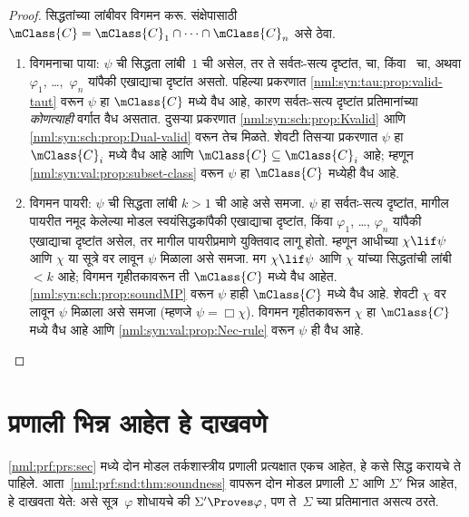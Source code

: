 \begin{proof}
  सिद्धतांच्या लांबीवर विगमन करू. संक्षेपासाठी
  $\mClass{C} =
  \mClass{C}_1 \cap \dots \cap \mClass{C}_n$ असे ठेवा.
  \begin{enumerate}
  \item विगमनाचा पाया: $\psi$ ची सिद्धता लांबी~$1$
    ची असेल, तर ते सर्वतः-सत्य दृष्टांत,
     चा, किंवा~\Dual{} चा,
    अथवा $\varphi_1$, \dots,~$\varphi_n$ यांपैकी
    एखाद्याचा दृष्टांत असतो. पहिल्या प्रकरणात
    \ref{nml:syn:tau:prop:valid-taut} वरून $\psi$
    हा $\mClass{C}$ मध्ये वैध आहे, कारण सर्वतः-सत्य
    दृष्टांत प्रतिमानांच्या \emph{कोणत्याही} वर्गात
    वैध असतात. दुसऱ्या प्रकरणात
    \ref{nml:syn:sch:prop:Kvalid} आणि
      \ref{nml:syn:sch:prop:Dual-valid} वरून तेच
    मिळते. शेवटी तिसऱ्या प्रकरणात $\psi$ हा
    $\mClass{C}_i$ मध्ये वैध आहे आणि
    $\mClass{C} \subseteq \mClass{C}_i$ आहे;
    म्हणून \ref{nml:syn:val:prop:subset-class}
    वरून $\psi$ हा $\mClass{C}$ मध्येही वैध आहे.
  \item विगमन पायरी: $\psi$ ची सिद्धता लांबी $k>1$
    ची आहे असे समजा. $\psi$ हा सर्वतः-सत्य दृष्टांत,
    मागील पायरीत नमूद केलेल्या मोडल स्वयंसिद्धकांपैकी
    एखाद्याचा दृष्टांत, किंवा $\varphi_1$, \dots,
    $\varphi_n$ यांपैकी एखाद्याचा दृष्टांत असेल,
    तर मागील पायरीप्रमाणे युक्तिवाद लागू होतो.
    म्हणून आधीच्या
    $\chi \lif \psi$ आणि $\chi$ या सूत्रे वर
    \MP{} लावून $\psi$ मिळाला असे समजा. मग
    $\chi \lif \psi$ आणि $\chi$ यांच्या सिद्धतांची
    लांबी $<k$ आहे; विगमन गृहीतकावरून ती
    $\mClass{C}$ मध्ये वैध आहेत.
    \ref{nml:syn:sch:prop:soundMP} वरून $\psi$
    हाही $\mClass{C}$ मध्ये वैध आहे. शेवटी
    $\chi$ वर \Nec{} लावून $\psi$ मिळाला असे समजा
    (म्हणजे $\psi = \Box\chi$). विगमन गृहीतकावरून
    $\chi$ हा $\mClass{C}$ मध्ये वैध आहे आणि
    \ref{nml:syn:val:prop:Nec-rule} वरून $\psi$ ही
    वैध आहे.
  \end{enumerate}
\end{proof}












\section{प्रणाली भिन्न आहेत हे दाखवणे}\label{nml:prf:dis:sec}

\ref{nml:prf:prs:sec} मध्ये दोन मोडल तर्कशास्त्रीय
प्रणाली प्रत्यक्षात एकच आहेत, हे कसे सिद्ध करायचे
ते पाहिले. आता~\ref{nml:prf:snd:thm:soundness}
वापरून दोन मोडल प्रणाली $\Sigma$ आणि $\Sigma'$
भिन्न आहेत, हे दाखवता येते: असे सूत्र~$\varphi$
शोधायचे की $\Sigma' \Proves \varphi$, पण ते~$\Sigma$
च्या प्रतिमानात असत्य ठरते.

